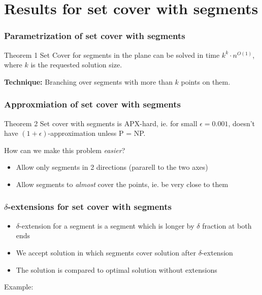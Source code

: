 \documentclass{beamer}
\begin{document}
\section{Results for set cover with segments }

\begin{frame}
\frametitle{Parametrization of set cover with segments}
\begin{block}{Theorem 1}
	Set Cover for segments in the plane can be solved in time
	$k^k \cdot n^{O(1)}$,\newline
	where $k$ is the requested solution size.
\end{block}

\textbf{Technique:} Branching over segments with more than $k$ points
on them.
\end{frame}

\begin{frame}
\frametitle{Approxmiation of set cover with segments}
\begin{block}{Theorem 2}
	Set cover with segments is APX-hard, ie.\newline
	for small $\epsilon =0.001$,
	doesn't have $(1+\epsilon)$-approximation unless P = NP.
\end{block}

How can we make this problem \textit{easier}?
\begin{itemize}
\item Allow only segments in 2 directions (pararell to the two axes)
\item Allow segments to \textit{almost} cover the points, ie. be very
close to them
\end{itemize}

\end{frame}

\begin{frame}
\frametitle{$\delta$-extensions for set cover with segments}
\begin{itemize}
\item $\delta$-extension for a segment is a segment which is longer by
$\delta$ fraction at both ends
\item We accept solution in which segments cover solution after
$\delta$-extension
\item The solution is compared to optimal solution without extensions
\end{itemize}

Example:


\end{frame}
\end{document}
